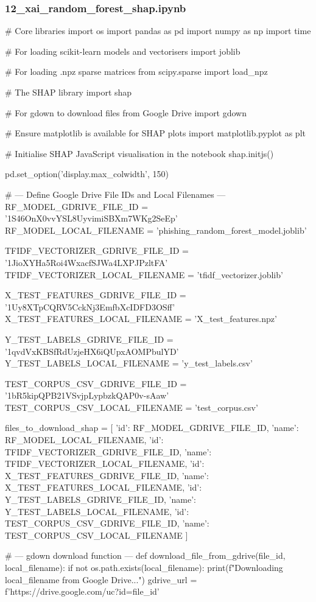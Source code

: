 \subsubsection*{12\_xai\_random\_forest\_shap.ipynb}

\begin{ffcode}
# Core libraries
import os
import pandas as pd
import numpy as np
import time

# For loading scikit-learn models and vectorisers
import joblib

# For loading .npz sparse matrices
from scipy.sparse import load_npz

# The SHAP library
import shap

# For gdown to download files from Google Drive
import gdown

# Ensure matplotlib is available for SHAP plots
import matplotlib.pyplot as plt

# Initialise SHAP JavaScript visualisation in the notebook
shap.initjs()

pd.set_option('display.max_colwidth', 150)

# --- Define Google Drive File IDs and Local Filenames ---
RF_MODEL_GDRIVE_FILE_ID = '1S46OnX0vvYSL8UyvimiSBXm7WKg2SeEp'
RF_MODEL_LOCAL_FILENAME = 'phishing_random_forest_model.joblib'

TFIDF_VECTORIZER_GDRIVE_FILE_ID = '1JioXYHa5Roi4WxacfSJWa4LXPJPzltFA'
TFIDF_VECTORIZER_LOCAL_FILENAME = 'tfidf_vectorizer.joblib'

X_TEST_FEATURES_GDRIVE_FILE_ID = '1Uy8XTpCQRV5CckNj3EmfbXcIDFD3OSff'
X_TEST_FEATURES_LOCAL_FILENAME = 'X_test_features.npz'

Y_TEST_LABELS_GDRIVE_FILE_ID = '1qvdVxKBSfRdUzjeHX6iQUpxAOMPbulYD'
Y_TEST_LABELS_LOCAL_FILENAME = 'y_test_labels.csv'

TEST_CORPUS_CSV_GDRIVE_FILE_ID = '1bR5kipQPB21VSvjpLypbzkQAP0v-sAaw'
TEST_CORPUS_CSV_LOCAL_FILENAME = 'test_corpus.csv'

files_to_download_shap = [
    {'id': RF_MODEL_GDRIVE_FILE_ID, 'name': RF_MODEL_LOCAL_FILENAME},
    {'id': TFIDF_VECTORIZER_GDRIVE_FILE_ID, 'name': TFIDF_VECTORIZER_LOCAL_FILENAME},
    {'id': X_TEST_FEATURES_GDRIVE_FILE_ID, 'name': X_TEST_FEATURES_LOCAL_FILENAME},
    {'id': Y_TEST_LABELS_GDRIVE_FILE_ID, 'name': Y_TEST_LABELS_LOCAL_FILENAME},
    {'id': TEST_CORPUS_CSV_GDRIVE_FILE_ID, 'name': TEST_CORPUS_CSV_LOCAL_FILENAME}
]

# --- gdown download function ---
def download_file_from_gdrive(file_id, local_filename):
    if not os.path.exists(local_filename):
        print(f"Downloading {local_filename} from Google Drive...")
        gdrive_url = f'https://drive.google.com/uc?id={file_id}'


\end{ffcode}
